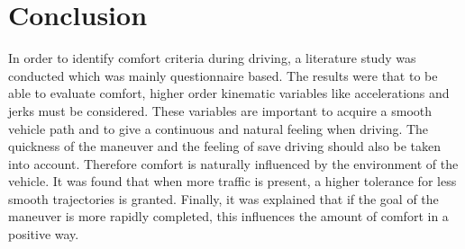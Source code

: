 %
%
%
%


\section{Conclusion}
In order to identify comfort criteria during driving, a literature study was conducted which was mainly questionnaire based. The results were that to be able to evaluate comfort, higher order kinematic variables like accelerations and jerks must be considered. These variables are important to acquire a smooth vehicle path and to give a continuous and natural feeling when driving. The quickness of the maneuver and the feeling of save driving should also be taken into account. Therefore comfort is naturally influenced by the environment of the vehicle. It was found that when more traffic is present, a higher tolerance for less smooth trajectories is granted. Finally, it was explained that if the goal of the maneuver is more rapidly completed, this influences the amount of comfort in a positive way.\\

